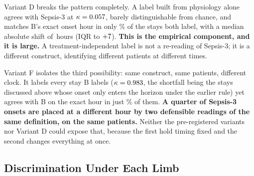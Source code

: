 Variant D breaks the pattern completely. A label built from physiology alone
agrees with Sepsis-3 at $\kappa = 0.057$, barely distinguishable from
chance, and matches B's exact onset hour in only \pcPctExactMatchD\% of the
stays both label, with a median absolute shift of \pcMedianAbsShiftHD\,hours
(IQR \pcIqrShiftLoHD{} to $+7$). \textbf{This is the empirical
component, and it is large.} A treatment-independent label is not a re-reading
of Sepsis-3; it is a different construct, identifying different patients at
different times.

Variant F isolates the third possibility: same construct, same patients,
different clock. It labels every stay B labels ($\kappa = 0.983$, the
shortfall being the \pcFNExtraInHorizon{} stays discussed above whose onset only
enters the horizon under the earlier rule) yet agrees with B on the exact hour
in just \pcPctExactMatchF\% of them. \textbf{A quarter of Sepsis-3 onsets are
placed at a different hour by two defensible readings of the same definition, on
the same patients.} Neither the pre-registered variants nor Variant D could
expose that, because the first hold timing fixed and the second changes
everything at once.

\subsection{Discrimination Under Each Limb}

